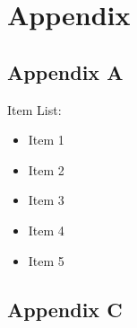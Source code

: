 \section{Appendix}
\subsection{Appendix A}
Item List:
\begin{itemize}
    \item Item 1
    \item Item 2
    \item Item 3
    \item Item 4
    \item Item 5
\end{itemize}

\subsection{Appendix C}
